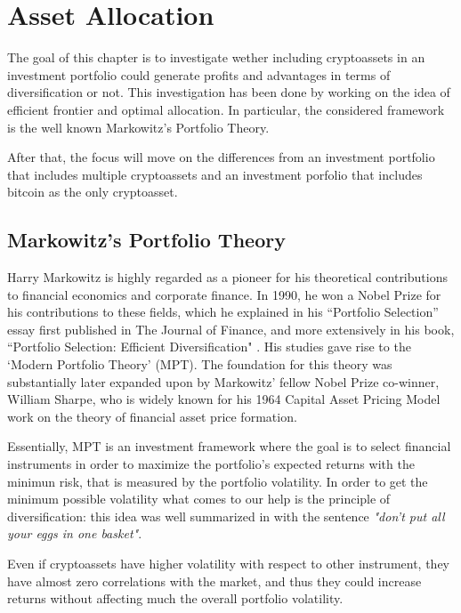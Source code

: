 \chapter{Asset Allocation}
\label{chpr:ch5}
\bigskip

The goal of this chapter is to investigate wether including cryptoassets in an investment portfolio could generate profits and advantages in terms of diversification or not. This investigation has been done by working on the idea of efficient frontier and optimal allocation. In particular, the considered framework is the well known Markowitz's Portfolio Theory.

After that, the focus will move on the differences from an investment portfolio that includes multiple cryptoassets and an investment porfolio that includes bitcoin as the only cryptoasset.


\section{Markowitz's Portfolio Theory}
Harry Markowitz is highly regarded as a pioneer for his theoretical contributions to
financial economics and corporate finance. In 1990, he won a Nobel Prize for his
contributions to these fields, which he explained in his “Portfolio Selection” \citep{mark52} essay first published in
The Journal of Finance, and more extensively in his book, “Portfolio Selection: Efficient Diversification" \citep{mark59}. His studies gave rise to the ‘Modern
Portfolio Theory’ (MPT). The foundation for this theory was substantially later expanded upon by
Markowitz’ fellow Nobel Prize co-winner, William Sharpe, who is widely known for his 1964 Capital
Asset Pricing Model work on the theory of financial asset price formation.

Essentially, MPT is an investment framework where the goal is to select financial instruments in order to maximize the portfolio's expected returns with the minimun risk, that is measured by the portfolio volatility. In order to get the minimum possible volatility what comes to our help is the principle of diversification: this idea was well summarized in \citep{Fabozzi7} with the sentence \textit{"don't put all your eggs in one basket"}.

\noindent
Even if cryptoassets have higher volatility with respect to other instrument, they have almost zero correlations with the market, and thus they could increase returns without affecting much the overall portfolio volatility.


